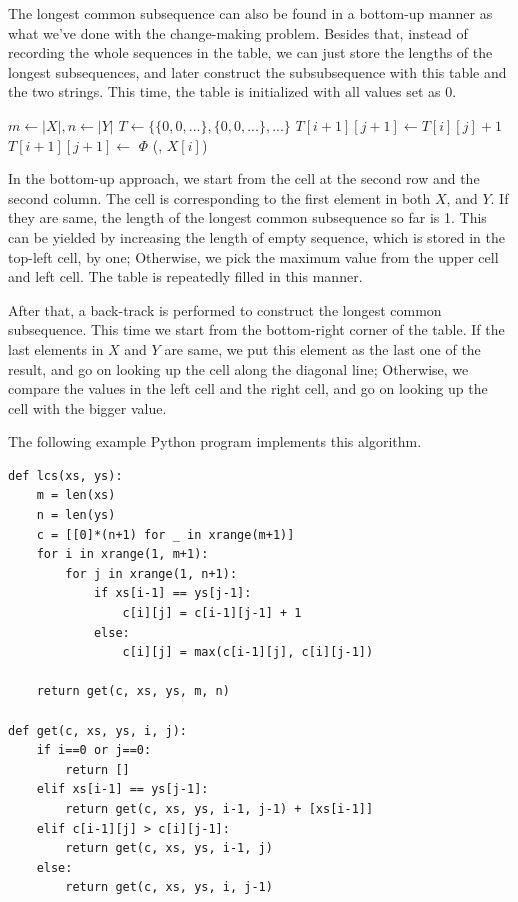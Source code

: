 \documentclass[UTF8]{article}
\begin{document}
The longest common subsequence can also be found in a bottom-up manner as what we've done
with the change-making problem. Besides that, instead of recording the whole sequences
in the table, we can just store the lengths of the longest subsequences, and later construct
the subsubsequence with this table and the two strings. This time, the table is
initialized with all values set as 0.

\begin{algorithmic}[1]
  \State $m \gets |X|, n \gets |Y|$
  \State $T \gets \{\{0, 0, ...\}, \{0, 0, ...\}, ...\}$ 
        \State $T[i+1][j+1] \gets T[i][j] + 1$
      \Else
        \State $T[i+1][j+1] \gets$ 
      \EndIf
    \EndFor
  \EndFor
  \State \Return {}
\EndFunction
\Statex
{}
    \State \Return $\Phi$
    \State \Return {}(, $X[i]$)
    \State \Return {}
  \Else
    \State \Return {}
  \EndIf
\EndFunction
\end{algorithmic}

In the bottom-up approach, we start from the cell at the second row and the second column.
The cell is corresponding to the first element in both $X$, and $Y$. If they are same,
the length of the longest common subsequence so far is 1. This can be yielded by increasing the
length of empty sequence, which is stored in the top-left cell, by one; Otherwise,
we pick the maximum value from the upper cell and left cell. The table is repeatedly
filled in this manner.

After that, a back-track is performed to construct the longest common subsequence. This
time we start from the bottom-right corner of the table. If the last elements in $X$
and $Y$ are same, we put this element as the last one of the result, and
go on looking up the cell along the diagonal line; Otherwise, we compare the values in
the left cell and the right cell, and go on looking up the cell with the bigger value.

The following example Python program implements this algorithm.

\lstset{language=Python}
\begin{lstlisting}
def lcs(xs, ys):
    m = len(xs)
    n = len(ys)
    c = [[0]*(n+1) for _ in xrange(m+1)]
    for i in xrange(1, m+1):
        for j in xrange(1, n+1):
            if xs[i-1] == ys[j-1]:
                c[i][j] = c[i-1][j-1] + 1
            else:
                c[i][j] = max(c[i-1][j], c[i][j-1])

    return get(c, xs, ys, m, n)

def get(c, xs, ys, i, j):
    if i==0 or j==0:
        return []
    elif xs[i-1] == ys[j-1]:
        return get(c, xs, ys, i-1, j-1) + [xs[i-1]]
    elif c[i-1][j] > c[i][j-1]:
        return get(c, xs, ys, i-1, j)
    else:
        return get(c, xs, ys, i, j-1)
\end{lstlisting}
\end{document}
